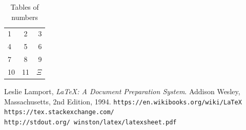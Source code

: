 \documentclass[11pt]{article}
\begin{document}
\begin{table}[htdp]
\caption{Tables of numbers}
\begin{center}
\begin{tabular}{ l | c || r } %
  \hline                       
  1 & 2 & 3 \\
  4 & 5 & 6 \\
  7 & 8 & 9 \\  
  10&11&$\Xi$\\ \hline  
\end{tabular}
\end{center}
\label{tab:myinfo} 
\end{table}

\begin{thebibliography}{99}

  Leslie Lamport,  \emph{\LaTeX: A Document Preparation System}.  Addison Wesley, Massachusetts,  2nd Edition,  1994.
 \texttt{https://en.wikibooks.org/wiki/LaTeX}
 \texttt{https://tex.stackexchange.com/}
 \texttt{http://stdout.org/~winston/latex/latexsheet.pdf}

\end{thebibliography}

\end{document}

